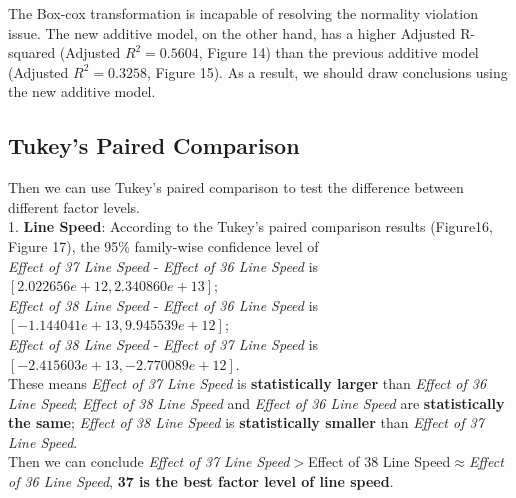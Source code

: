\documentclass[11pt,a4paper]{article}
\begin{document}
The Box-cox transformation is incapable of resolving the normality violation issue. The new additive model, on the other hand, has a higher Adjusted R-squared (Adjusted $R^2=0.5604$, Figure 14) than the previous additive model (Adjusted $R^2=0.3258$, Figure 15). As a result, we should draw conclusions using the new additive model.


\subsection{Tukey’s Paired Comparison}
Then we can use Tukey’s paired comparison to test the difference between different factor levels.\\
1. \textbf{Line Speed}: According to the Tukey’s paired comparison results (Figure16, Figure 17), the 95\% family-wise confidence level of\\
\textit{Effect of 37 Line Speed} - \textit{Effect of 36 Line Speed} is $[2.022656e+12,2.340860e+13]$;\\
\textit{Effect of 38 Line Speed} - \textit{Effect of 36 Line Speed} is $[-1.144041e+13 ,9.945539e+12]$;\\
\textit{Effect of 38 Line Speed} - \textit{Effect of 37 Line Speed} is $[-2.415603e+13, -2.770089e+12]$.\\
These means \textit{Effect of 37 Line Speed} is \textbf{statistically larger} than \textit{Effect of 36 Line Speed}; \textit{Effect of 38 Line Speed} and \textit{Effect of 36 Line Speed} are \textbf{statistically the same}; \textit{Effect of 38 Line Speed} is \textbf{statistically smaller} than \textit{Effect of 37 Line Speed}.\\
Then we can conclude \textit{Effect of 37 Line Speed}$>${Effect of 38 Line Speed}$\approx$\textit{Effect of 36 Line Speed}, \textbf{37 is the best factor level of line speed}.\\
\end{document}
